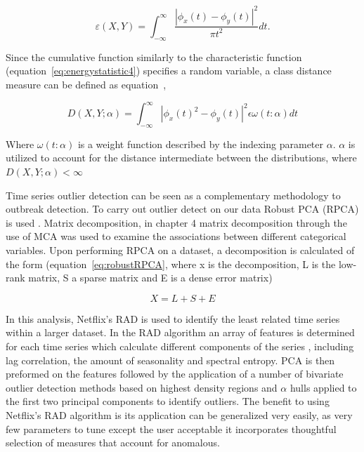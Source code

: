 \begin{equation} 
\varepsilon (X,Y) =\int_{-\infty}^{\infty} \frac{|\phi_{x}(t)-\phi_{y}(t)|^2}{\pi t^2} dt.
\label{eq:energystatistic4}  \end{equation} 

Since the cumulative function similarly to the characteristic function (equation~\ref{eq:energystatistic4}) specifies a random variable, a class distance measure can be defined as equation~\label{eq:energystatistic5},

\begin{equation} 
D(X,Y;\alpha)=\int_{-\infty}^{\infty}|\phi_x(t)^2-\phi_y(t)|^2 \epsilon \omega(t:\alpha) dt
\label{eq:energystatistic5}  \end{equation} 

Where $\omega(t:\alpha)$ is a weight function described by the indexing parameter $\alpha$. $\alpha$ is utilized to account for the distance intermediate between the distributions, where $D(X,Y;\alpha)<\infty$

Time series outlier detection can be seen  as a complementary methodology to outbreak detection. To carry out outlier detect on our data Robust PCA (RPCA) is used \citep{zhou2010stable}. Matrix decomposition, in chapter 4 matrix decomposition through the use of MCA was used to examine the associations between different categorical variables. Upon performing RPCA on a dataset, a decomposition is calculated of the form (equation~\ref{eq:robustRPCA}, where x is the decomposition, L is the low-rank matrix, S a sparse matrix and E is a dense error matrix)

\begin{equation} 
X =L+S+E
\label{eq:robustRPCA}  \end{equation} 


In this analysis, Netflix's RAD  \citep{RAD2017} is used to identify the least related time series within a larger dataset. In the RAD algorithm an array of features is determined for each time series which calculate different components of the series , including lag correlation, the amount of seasonality and spectral entropy. PCA is then preformed on the features followed by the application of a number of bivariate  outlier detection methods based on highest density regions and $\alpha$ hulls applied to the first two principal components to identify outliers. The benefit to using Netflix's RAD algorithm is its application can be generalized very easily, as very few parameters to tune except the user acceptable it incorporates thoughtful selection of measures that account for anomalous.
 
